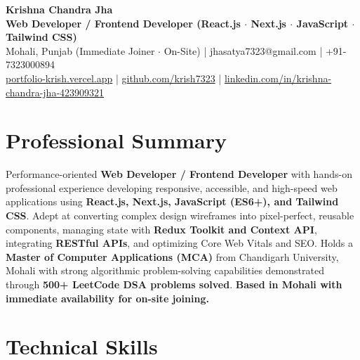 \documentclass[a4paper,10pt]{article}
\begin{document}
\begin{center}

    {\LARGE \textbf{Krishna Chandra Jha}} \\[2.5pt]

    \textbf{Web Developer / Frontend Developer (React.js $\cdot$ Next.js $\cdot$ JavaScript $\cdot$ Tailwind CSS)} \\[3.5pt]

    Mohali, Punjab (Immediate Joiner $\cdot$ On-Site)
    \quad | \quad
    jhasatya7323@gmail.com
    \quad | \quad
    +91-7323000894
    \\[2.5pt]

    \href{https://portfolio-ashen-alpha-dv0whhsamo.vercel.app/}{portfolio-krish.vercel.app}
    \quad | \quad
    \href{https://github.com/krish7323}{github.com/krish7323}
    \quad | \quad
    \href{https://linkedin.com/in/krishna-chandra-jha-423909321}
    {linkedin.com/in/krishna-chandra-jha-423909321}

\end{center}

\section*{Professional Summary}

Performance-oriented \textbf{Web Developer / Frontend Developer} with hands-on professional experience developing responsive, accessible, and high-speed web applications using \textbf{React.js, Next.js, JavaScript (ES6+), and Tailwind CSS}. Adept at converting complex design wireframes into pixel-perfect, reusable components, managing state with \textbf{Redux Toolkit and Context API}, integrating \textbf{RESTful APIs}, and optimizing Core Web Vitals and SEO. Holds a \textbf{Master of Computer Applications (MCA)} from Chandigarh University, Mohali with strong algorithmic problem-solving capabilities demonstrated through \textbf{500+ LeetCode DSA problems solved}. \textbf{Based in Mohali with immediate availability for on-site joining.}

\section*{Technical Skills}
\end{document}

